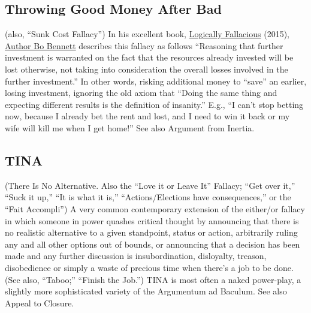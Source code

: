\documentclass[10pt,a4paper,british]{article}
\begin{document}
\begin{multicols}{2}
	\subsection{Throwing Good Money After Bad} (also, ``Sunk Cost Fallacy'') In his excellent book, \href{https://www.amazon.com/Logically-Fallacious-Ultimate-Collection-Fallacies/dp/1456624539/}{Logically Fallacious} (2015), \href{https://www.logicallyfallacious.com/tools/lp/Bo/LogicalFallacies/173/Sunk_Cost_Fallacy}{Author Bo Bennett} describes this fallacy as follows ``Reasoning that further investment is warranted on the fact that the resources already invested will be lost otherwise, not taking into consideration the overall losses involved in the further investment.''  In other words, risking additional money to ``save'' an earlier, losing investment, ignoring the old axiom that ``Doing the same thing and expecting different results is the definition of insanity.'' E.g., ``I can't stop betting now, because I already bet the rent and lost, and I need to win it back or my wife will kill me when I get home!'' See also Argument from Inertia.  

	\subsection{TINA} (There Is No Alternative. Also the ``Love it or Leave It'' Fallacy; ``Get over it,'' ``Suck it up,'' ``It is what it is,'' ``Actions/Elections have consequences,'' or the ``Fait Accompli'') A very common contemporary extension of the either/or fallacy in which someone in power quashes critical thought by announcing that there is no realistic alternative to a given standpoint, status or action, arbitrarily ruling any and all other options out of bounds, or announcing that a decision has been made and any further discussion is insubordination, disloyalty, treason, disobedience or simply a waste of precious time when there's a job to be done. (See also, ``Taboo;'' ``Finish the Job.'')  TINA is most often a naked power{-}play, a slightly more sophisticated variety of the Argumentum ad Baculum.  See also Appeal to Closure.  


\end{multicols}
\end{document}
